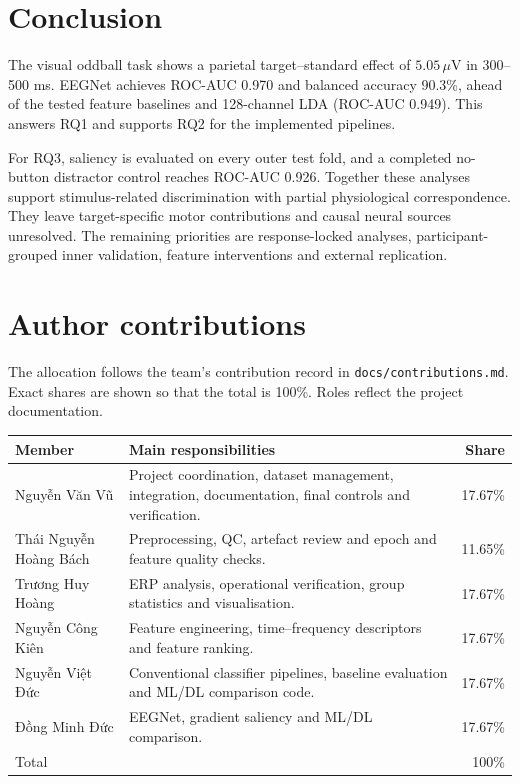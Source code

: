 \documentclass[11pt,a4paper]{article}
\newcommand{\code}[1]{\nolinkurl{#1}}
\begin{document}
\section{Conclusion}
The visual oddball task shows a parietal target--standard effect of $5.05\,\mu$V in 300--500 ms. EEGNet achieves ROC-AUC 0.970 and balanced accuracy 90.3\%, ahead of the tested feature baselines and 128-channel LDA (ROC-AUC 0.949). This answers RQ1 and supports RQ2 for the implemented pipelines.

For RQ3, saliency is evaluated on every outer test fold, and a completed no-button distractor control reaches ROC-AUC 0.926. Together these analyses support stimulus-related discrimination with partial physiological correspondence. They leave target-specific motor contributions and causal neural sources unresolved. The remaining priorities are response-locked analyses, participant-grouped inner validation, feature interventions and external replication.


\needspace{0.45\textheight}
\section{Author contributions}
The allocation follows the team's contribution record in \code{docs/contributions.md}. Exact shares are shown so that the total is 100\%. Roles reflect the project documentation.

\begin{center}\begin{minipage}{\linewidth}\centering
\small\renewcommand{\arraystretch}{1.15}
\label{tab:contributions}
\begin{tabularx}{\linewidth}{lYr}
\toprule
Member & Main responsibilities & Share\\\midrule
Nguyễn Văn Vũ & Project coordination, dataset management, integration, documentation, final controls and verification. & 17.67\%\\
Thái Nguyễn Hoàng Bách & Preprocessing, QC, artefact review and epoch and feature quality checks. & 11.65\%\\
Trương Huy Hoàng & ERP analysis, operational verification, group statistics and visualisation. & 17.67\%\\
Nguyễn Công Kiên & Feature engineering, time--frequency descriptors and feature ranking. & 17.67\%\\
Nguyễn Việt Đức & Conventional classifier pipelines, baseline evaluation and ML/DL comparison code. & 17.67\%\\
Đồng Minh Đức & EEGNet, gradient saliency and ML/DL comparison. & 17.67\%\\\midrule
Total & & 100\%\\\bottomrule
\end{tabularx}
\end{minipage}\end{center}
\end{document}
